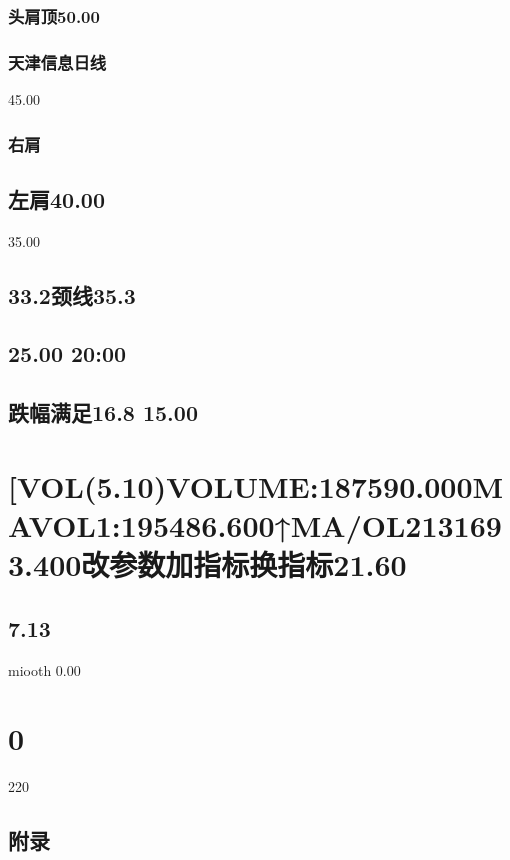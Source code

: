 \documentclass{article}
\begin{document}
\subsubsection{头肩顶50.00}

\subsubsection{天津信息日线}

45.00

\subsubsection{右肩}

\subsection{左肩40.00}

35.00

\subsection{33.2颈线35.3}

\subsection{25.00 20:00}

\subsection{跌幅满足16.8 15.00}

\section{[VOL(5.10)VOLUME:187590.000MAVOL1:195486.600↑MA/OL2131693.400改参数加指标换指标21.60}

\subsection{7.13}

miooth 0.00

\section{0}

220

\clearpage

\subsection{附录}
\end{document}
